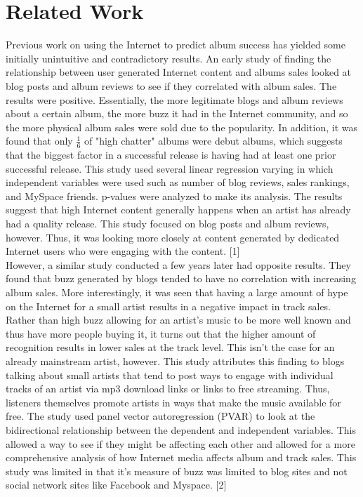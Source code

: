 \documentclass[conference]{IEEEtran}
\begin{document}
\section{Related Work}
Previous work on using the Internet to predict album success has yielded some initially unintuitive and contradictory results. An early study of finding the relationship between user generated Internet content and albums sales looked at blog posts and album reviews to see if they correlated with album sales. The results were positive. Essentially, the more legitimate blogs and album reviews about a certain album, the more buzz it had in the Internet community, and so the more physical album sales were sold due to the popularity. In addition, it was found that only $\frac{1}{6}$ of "high chatter" albums were debut albums, which suggests that the biggest factor in a successful release is having had at least one prior successful release. This study used several linear regression varying in which independent variables were used such as number of blog reviews, sales rankings, and MySpace friends. p-values were analyzed to make its analysis. The results suggest that high Internet content generally happens when an artist has already had a quality release. This study focused on blog posts and album reviews, however. Thus, it was looking more closely at content generated by dedicated Internet users who were engaging with the content. [1]\\

However, a similar study conducted a few years later had opposite results. They found that buzz generated by blogs tended to have no correlation with increasing album sales. More interestingly, it was seen that having a large amount of hype on the Internet for a small artist results in a negative impact in track sales. Rather than high buzz allowing for an artist's music to be more well known and thus have more people buying it, it turns out that the higher amount of recognition results in lower sales at the track level. This isn't the case for an already mainstream artist, however. This study attributes this finding to blogs talking about small artists that tend to post ways to engage with individual tracks of an artist via mp3 download links or links to free streaming. Thus, listeners themselves promote artists in ways that make the music available for free. The study used panel vector autoregression (PVAR) to look at the bidirectional relationship between the dependent and independent variables. This allowed a way to see if they might be affecting each other and allowed for a more comprehensive analysis of how Internet media affects album and track sales. This study was limited in that it's measure of buzz was limited to blog sites and not social network sites like Facebook and Myspace.  [2]
\end{document}
